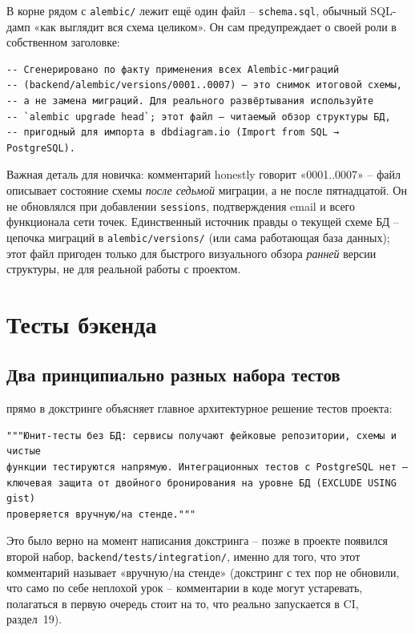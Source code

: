 В корне  рядом с \texttt{alembic/} лежит ещё один файл --
\texttt{schema.sql}, обычный SQL-дамп «как выглядит вся схема целиком».
Он сам предупреждает о своей роли в собственном заголовке:
\begin{verbatim}
-- Сгенерировано по факту применения всех Alembic-миграций
-- (backend/alembic/versions/0001..0007) — это снимок итоговой схемы,
-- а не замена миграций. Для реального развёртывания используйте
-- `alembic upgrade head`; этот файл — читаемый обзор структуры БД,
-- пригодный для импорта в dbdiagram.io (Import from SQL → PostgreSQL).
\end{verbatim}
Важная деталь для новичка: комментарий honestly говорит «0001..0007» --
файл описывает состояние схемы \emph{после седьмой} миграции, а не после
пятнадцатой. Он не обновлялся при добавлении \texttt{sessions},
подтверждения email и всего функционала сети точек. Единственный
источник правды о текущей схеме БД -- цепочка миграций в
\texttt{alembic/versions/} (или сама работающая база данных); этот файл
пригоден только для быстрого визуального обзора \emph{ранней} версии
структуры, не для реальной работы с проектом.

\section{Тесты бэкенда}

\subsection{Два принципиально разных набора тестов}

 прямо в докстринге объясняет главное
архитектурное решение тестов проекта:
\begin{verbatim}
"""Юнит-тесты без БД: сервисы получают фейковые репозитории, схемы и чистые
функции тестируются напрямую. Интеграционных тестов с PostgreSQL нет —
ключевая защита от двойного бронирования на уровне БД (EXCLUDE USING gist)
проверяется вручную/на стенде."""
\end{verbatim}
Это было верно на момент написания докстринга -- позже в проекте
появился второй набор, \texttt{backend/tests/integration/}, именно для
того, что этот комментарий называет «вручную/на стенде» (докстринг с тех
пор не обновили, что само по себе неплохой урок -- комментарии в коде
могут устаревать, полагаться в первую очередь стоит на то, что реально
запускается в CI, раздел~19).

